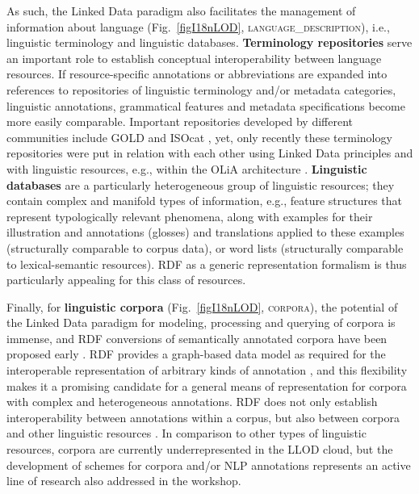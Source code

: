 As such, the Linked Data paradigm also facilitates the management of information about language (Fig.\ \ref{figI18nLOD}, \textsc{language\_description}), i.e., linguistic terminology and linguistic databases. \textbf{Terminology repositories} serve an important role to establish conceptual interoperability between language resources. If resource-specific annotations or abbreviations are expanded into references to repositories of linguistic terminology and/or metadata categories, linguistic annotations, grammatical features and metadata specifications become more easily comparable. %
Important repositories developed by different communities include GOLD \citep{farrar-langendoen03} and ISOcat \citep{wright2004global,windhouwer-wright2012}, yet, only recently these terminology repositories were put in relation with each other using Linked Data principles and with linguistic resources, e.g., within the OLiA architecture \citep{chiarcos-2012-olia-lrec}.
\textbf{Linguistic databases} are a particularly heterogeneous group of linguistic resources; they contain complex and manifold types of information, e.g., feature structures that represent typologically relevant phenomena, along with examples for their illustration and annotations (glosses) and translations applied to these examples (structurally comparable to corpus data), or word lists (structurally comparable to lexical-semantic resources). RDF as a generic representation formalism is thus particularly appealing for this class of resources.

Finally, for \textbf{linguistic corpora} (Fig.\ \ref{figI18nLOD}, \textsc{corpora}), the potential of the Linked Data paradigm for modeling, processing and querying of corpora is immense, and RDF conversions of semantically annotated corpora have been proposed early \citep{burchardt2008formalising}. RDF provides a graph-based data model as required for the interoperable representation of arbitrary kinds of annotation \citep{bird01,ide-suderman07-graf}, and this flexibility makes it a promising candidate for a general means of representation for corpora with complex and heterogeneous annotations. RDF does not only establish interoperability between annotations within a corpus, but also between corpora and other linguistic resources \citep{chiarcos-2012-ldl-powla}. In comparison to other types of linguistic resources, corpora are currently underrepresented in the LLOD cloud, but the development of schemes for corpora and/or NLP annotations represents an active line of research \citep{chiarcos2012-eswc-powla,hellmann-2012-ekaw} also addressed in the workshop.

